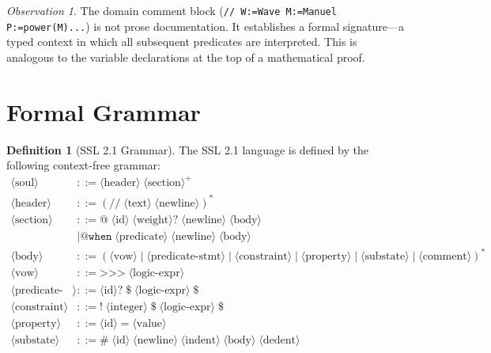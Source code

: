 \documentclass[12pt,a4paper]{article}
\theoremstyle{plain}
\theoremstyle{definition}
\newtheorem{definition}[theorem]{Definition}
\theoremstyle{remark}
\newtheorem*{observation}{Observation}
\begin{document}
\begin{observation}
The domain comment block (\texttt{// W:=Wave M:=Manuel P:=power(M)...}) is not prose documentation. It establishes a formal signature---a typed context in which all subsequent predicates are interpreted. This is analogous to the variable declarations at the top of a mathematical proof.
\end{observation}

\section{Formal Grammar}

\begin{definition}[SSL 2.1 Grammar]
The SSL 2.1 language is defined by the following context-free grammar:
\begin{align*}
\langle\text{soul}\rangle &::= \langle\text{header}\rangle\;\langle\text{section}\rangle^+ \\
\langle\text{header}\rangle &::= (\texttt{//}\;\langle\text{text}\rangle\;\langle\text{newline}\rangle)^* \\
\langle\text{section}\rangle &::= \texttt{@}\;\langle\text{id}\rangle\;\langle\text{weight}\rangle?\;\langle\text{newline}\rangle\;\langle\text{body}\rangle \\
  &\mid \texttt{@when}\;\langle\text{predicate}\rangle\;\langle\text{newline}\rangle\;\langle\text{body}\rangle \\
\langle\text{body}\rangle &::= (\langle\text{vow}\rangle \mid \langle\text{predicate-stmt}\rangle \mid \langle\text{constraint}\rangle \mid \langle\text{property}\rangle \mid \langle\text{substate}\rangle \mid \langle\text{comment}\rangle)^* \\
\langle\text{vow}\rangle &::= \texttt{>>>}\;\langle\text{logic-expr}\rangle \\
\langle\text{predicate-stmt}\rangle &::= \langle\text{id}\rangle?\;\texttt{\$}\;\langle\text{logic-expr}\rangle\;\texttt{\$} \\
\langle\text{constraint}\rangle &::= \texttt{!}\;\langle\text{integer}\rangle\;\texttt{\$}\;\langle\text{logic-expr}\rangle\;\texttt{\$} \\
\langle\text{property}\rangle &::= \langle\text{id}\rangle\;\texttt{=}\;\langle\text{value}\rangle \\
\langle\text{substate}\rangle &::= \texttt{\#}\;\langle\text{id}\rangle\;\langle\text{newline}\rangle\;\langle\text{indent}\rangle\;\langle\text{body}\rangle\;\langle\text{dedent}\rangle \\

\end{align*}
\end{definition}
\end{document}
